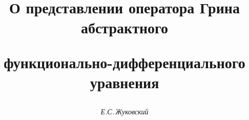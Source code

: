 

 


% 


\newcommand{\col}{\operatorname{col}} 


\newcommand{\ind}{\operatorname{ind}} 


\newcommand{\tts}[1]{} 


 




 


\setcounter{page}{30} 












 


\author{\it Е.С.\,Жуковский} 




\title{О представлении оператора Грина абстрактного  


функционально-дифференциального уравнения} 


 


\date{} 




\pagestyle{plain} %


 




\maketitle 



